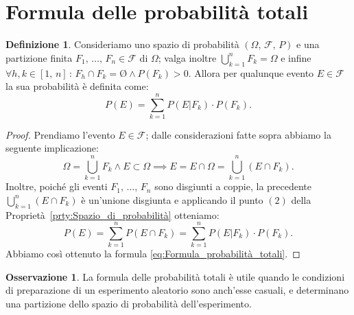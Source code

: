 \documentclass[12pt,openany]{amsbook}
\theoremstyle{plain}
\numberwithin{equation}{section} %
\theoremstyle{definition}
\newtheorem{defn}[thm]{Definizione}
\newtheorem{obsv}[thm]{Osservazione}
\begin{document}
        \section{Formula delle probabilità totali}
            \begin{defn}\label{defn:Probabilità_totali}
                Consideriamo uno spazio di probabilità $(\Omega,\,\mathscr{F},\,P)$ e una partizione finita $F_1,\,\ldots,\,F_n \in \mathscr{F}$ di $\Omega$; valga inoltre $\bigcup_{k=1}^{n} F_k = \Omega$ e infine $\forall h,k \in [1,\,n] \,:\, F_h \cap F_k = \text{\O} \land P(F_k) > 0$.
                Allora per qualunque evento $E \in \mathscr{F}$ la sua probabilità è definita come:
                \begin{equation}\label{eq:Formula_probabilità_totali}
                    P(E) = \sum_{k=1}^{n} P(E|F_k) \cdot P(F_k)
                . 
                \end{equation}
            \end{defn}
            \begin{proof}
                Prendiamo l'evento $E \in \mathscr{F}$; dalle considerazioni fatte sopra abbiamo la seguente implicazione:  \[
                    \Omega = \bigcup_{k=1}^{n} F_k \land E \subset \Omega \implies E = E \cap \Omega = \bigcup_{k=1}^{n} (E \cap F_k)
                .\] 
                Inoltre, poiché gli eventi $F_1,\,\ldots,\,F_n$ sono disgiunti a coppie, la precedente $\bigcup_{k=1}^{n} (E \cap F_k)$ è un'unione disgiunta e applicando il punto $(2)$ della Proprietà~\ref{prty:Spazio_di_probabilità} otteniamo: \[
                    P(E) = \sum_{k=1}^{n} P(E \cap F_k) = \sum_{k=1}^{n} P(E|F_k) \cdot P(F_k)
                .\] 
                Abbiamo così ottenuto la formula \eqref{eq:Formula_probabilità_totali}.
            \end{proof}
            \begin{obsv}
                La formula delle probabilità totali è utile quando le condizioni di preparazione di un esperimento aleatorio sono anch'esse casuali, e determinano una partizione dello spazio di probabilità dell'esperimento.
            \end{obsv}
\end{document}
